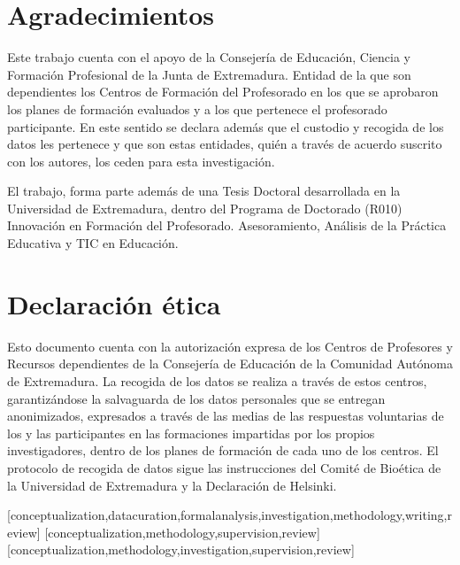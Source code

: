 \documentclass[spanish]{textolivre}
\begin{document}
\section{Agradecimientos}\label{sec-equacao}
Este trabajo cuenta con el apoyo de la Consejería de Educación, Ciencia y Formación Profesional de la Junta de Extremadura. Entidad de la que son dependientes los Centros de Formación del Profesorado en los que se aprobaron los planes de formación evaluados y a los que pertenece el profesorado participante. En este sentido se declara además que el custodio y recogida de los datos les pertenece y que son estas entidades, quién a través de acuerdo suscrito con los autores, los ceden para esta investigación.

El trabajo, forma parte además de una Tesis Doctoral desarrollada en la Universidad de Extremadura, dentro del Programa de Doctorado (R010) Innovación en Formación del Profesorado. Asesoramiento, Análisis de la Práctica Educativa y TIC en Educación.


\section{Declaración ética}\label{sec-codigos}
Esto documento cuenta con la autorización expresa de los Centros de Profesores y Recursos dependientes de la Consejería de Educación de la Comunidad Autónoma de Extremadura. La recogida de los datos se realiza a través de estos centros, garantizándose la salvaguarda de los datos personales que se entregan anonimizados, expresados a través de las medias de las respuestas voluntarias de los y las participantes en las formaciones impartidas por los propios investigadores, dentro de los planes de formación de cada uno de los centros. El protocolo de recogida de datos sigue las instrucciones del Comité de Bioética de la Universidad de Extremadura y la Declaración de Helsinki.


\printbibliography\label{sec-bib}


\begin{contributors}
[conceptualization,datacuration,formalanalysis,investigation,methodology,writing,review]
[conceptualization,methodology,supervision,review]
[conceptualization,methodology,investigation,supervision,review]
\end{contributors}
\end{document}
